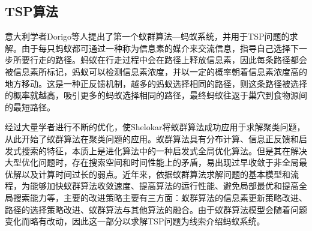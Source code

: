 \subsection{TSP算法}
\par 意大利学者\rm{Dorigo}等人提出了第一个蚁群算法—蚂蚁系统，并用于\rm{TSP}问题的求解。由于每只蚂蚁都可通过一种称为信息素的媒介来交流信息，指导自己选择下一步所要行走的路径。蚂蚁在行走过程中会在路径上释放信息素，因此每条路径都会被信息素所标记，蚂蚁可以检测信息素浓度，并以一定的概率朝着信息素浓度高的地方移动。这是一种正反馈机制，越多的蚂蚁选择相同的路径，则这条路径被选择的概率就越高，吸引更多的蚂蚁选择相同的路径，最终蚂蚁往返于巢穴到食物源间的最短路径。
\par 经过大量学者进行不断的优化，使\rm{Shelokar}将蚁群算法成功应用于求解聚类问题，从此开始了蚁群算法在聚类问题的应用。蚁群算法具有分布计算、信息正反馈和启发式搜索的特征，本质上是进化算法中的一种启发式全局优化算法。但是其在解决大型优化问题时，存在搜索空间和时间性能上的矛盾，易出现过早收敛于非全局最优解以及计算时间过长的弱点。近年来，依据蚁群算法求解问题的基本模型和流程，为能够加快蚁群算法收敛速度、提高算法的运行性能、避免局部最优和提高全局搜索能力等，主要的改进策略主要有三方面：蚁群算法的信息素更新策略改进、路径的选择策略改进、蚁群算法与其他算法的融合。由于蚁群算法模型会随着问题变化而略有改动，因此这一部分以求解TSP问题为线索介绍蚂蚁系统。